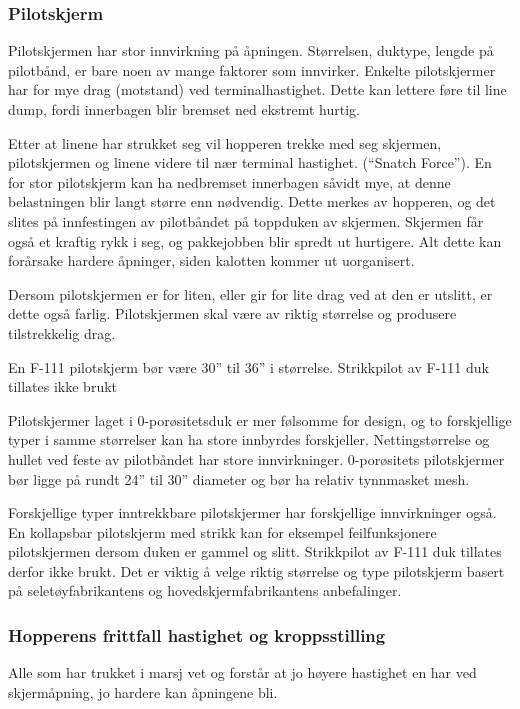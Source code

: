 \subsubsection{Pilotskjerm}
Pilotskjermen har stor innvirkning på åpningen. Størrelsen, duktype, lengde på pilotbånd, er bare noen av mange faktorer som innvirker. Enkelte pilotskjermer har for mye drag (motstand) ved terminalhastighet. Dette kan lettere føre til line dump, fordi innerbagen blir bremset ned ekstremt hurtig.

Etter at linene har strukket seg vil hopperen trekke med seg skjermen, pilotskjermen og linene videre til nær terminal hastighet. (``Snatch Force''). En for stor pilotskjerm kan ha nedbremset innerbagen såvidt mye, at denne belastningen blir langt større enn nødvendig. Dette merkes av hopperen, og det slites på innfestingen av pilotbåndet på toppduken av skjermen. Skjermen får også et kraftig rykk i seg, og pakkejobben blir spredt ut hurtigere. Alt dette kan forårsake hardere åpninger, siden kalotten kommer ut uorganisert.

Dersom pilotskjermen er for liten, eller gir for lite drag ved at den er utslitt, er dette også farlig. Pilotskjermen skal være av riktig størrelse og produsere tilstrekkelig drag.

En F-111 pilotskjerm bør være 30'' til 36'' i størrelse. Strikkpilot av F-111 duk tillates ikke brukt

Pilotskjermer laget i 0-porøsitetsduk er mer følsomme for design, og to forskjellige typer i samme størrelser kan ha store innbyrdes forskjeller. Nettingstørrelse og hullet ved feste av pilotbåndet har store innvirkninger. 0-porøsitets pilotskjermer bør ligge på rundt 24'' til 30'' diameter og bør ha relativ tynnmasket mesh.

Forskjellige typer inntrekkbare pilotskjermer har forskjellige innvirkninger også. En kollapsbar pilotskjerm med strikk kan for eksempel feilfunksjonere pilotskjermen dersom duken er gammel og slitt. Strikkpilot av F-111 duk tillates derfor ikke brukt. Det er viktig å velge riktig størrelse og type pilotskjerm basert på seletøyfabrikantens og hovedskjermfabrikantens anbefalinger.

\subsubsection{Hopperens frittfall hastighet og kroppsstilling}
Alle som har trukket i marsj vet og forstår at jo høyere hastighet en har ved skjermåpning, jo hardere kan åpningene bli.

